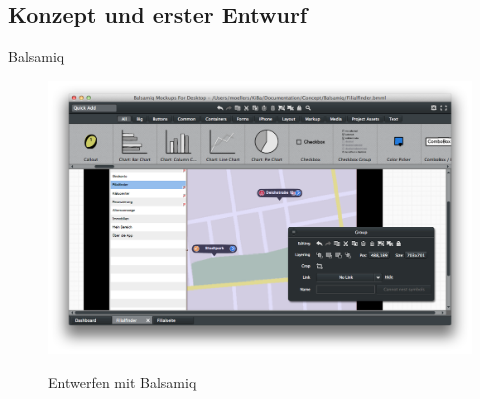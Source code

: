 \subsection{Konzept und erster Entwurf}
Balsamiq
\begin{figure}
	\centering
	\includegraphics[scale=.3]{Pictures/BalsamiqEntwurf}
	\label{fig:BalsamiqEntwurf}
	\caption{Entwerfen mit Balsamiq}
\end{figure}

